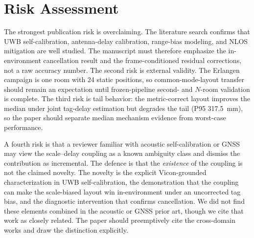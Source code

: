 \documentclass[11pt,a4paper]{article}
\begin{document}
\section{Risk Assessment}

The strongest publication risk is overclaiming. The literature search confirms that UWB self-calibration, antenna-delay calibration, range-bias modeling, and NLOS mitigation are well studied. The manuscript must therefore emphasize the in-environment cancellation result and the frame-conditioned residual corrections, not a raw accuracy number. The second risk is external validity. The Erlangen campaign is one room with 24 static positions, so common-mode-layout transfer should remain an expectation until frozen-pipeline second- and $N$-room validation is complete. The third risk is tail behavior: the metric-correct layout improves the median under joint tag-delay estimation but degrades the tail (P95 317.5~mm), so the paper should separate median mechanism evidence from worst-case performance.

A fourth risk is that a reviewer familiar with acoustic self-calibration or GNSS
may view the scale--delay coupling as a known ambiguity class and dismiss the
contribution as incremental. The defence is that the \emph{existence} of the
coupling is not the claimed novelty. The novelty is the explicit Vicon-grounded
characterization in UWB self-calibration, the demonstration that the coupling can
make the scale-biased layout win in-environment under an uncorrected tag
bias, and the diagnostic intervention that confirms cancellation. We did not find
these elements combined in the acoustic or GNSS prior art, though we cite that work
as closely related. The paper should
preemptively cite the cross-domain works and draw the distinction explicitly.
\end{document}

